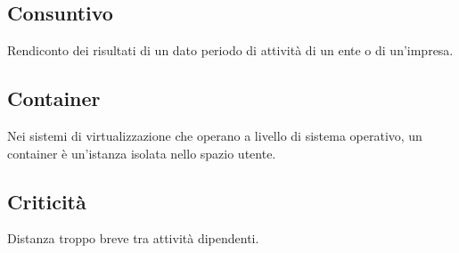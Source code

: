 \documentclass[../glossario.tex]{subfiles}
\begin{document}
\subsection*{Consuntivo}
Rendiconto dei risultati di un dato periodo di attività di un ente o di un'impresa.

\subsection*{Container}
Nei sistemi di virtualizzazione che operano a livello di sistema operativo, un container è un’istanza isolata nello spazio utente.

\subsection*{Criticità}
Distanza troppo breve tra attività dipendenti.
\end{document}
